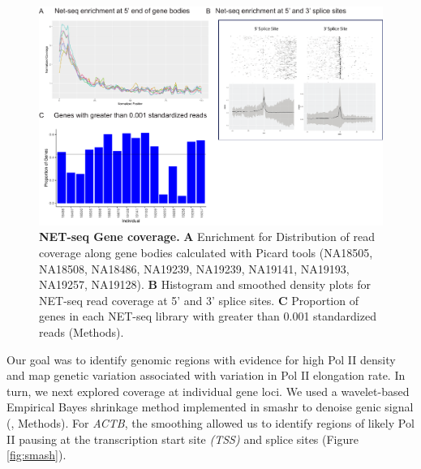 \begin{figure}
\centering \includegraphics[trim=0 .3in 0
  0,clip,width=5in]{img/ch04/Figure3.pdf}
\caption[NET-seq Gene coverage.]{\textbf{NET-seq Gene coverage.} {\bf A} Enrichment for Distribution of read coverage along gene bodies calculated with Picard tools (NA18505, NA18508, NA18486, NA19239, NA19239, NA19141, NA19193, NA19257, NA19128). {\bf B} Histogram and smoothed density plots for NET-seq read coverage at 5' and 3' splice sites. {\bf C} Proportion of genes in each NET-seq library with greater than 0.001 standardized reads (Methods).}
\label{fig:genecov}
\end{figure}


Our goal was to identify genomic regions with evidence for high Pol II density and map genetic variation associated with variation in Pol II elongation rate. In turn, we next explored coverage at individual gene loci. We used a wavelet-based Empirical Bayes shrinkage method implemented in smashr to denoise genic signal (\citep{xing_flexible_2016}, Methods). For \emph{ACTB}, the smoothing allowed us to identify regions of likely Pol II pausing at the transcription start site \emph{(TSS)} and splice sites (Figure \ref{fig:smash}). 



